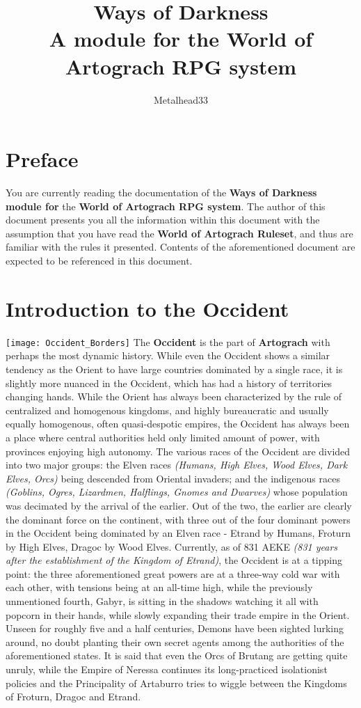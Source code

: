 \documentclass[openany,11pt,a4paper]{book}
\author{Metalhead33}
\title{Ways of Darkness\\
   \normalsize A module for the World of Artograch RPG system}
\begin{document}
\maketitle
\tableofcontents
\chapter*{Preface}
You are currently reading the documentation of the \textbf{Ways of Darkness module for} the \textbf{World of Artograch RPG system}. The author of this document presents you all the information within this document with the assumption that you have read the \textbf{World of Artograch Ruleset}, and thus are familiar with the rules it presented. Contents of the aforementioned document are expected to be referenced in this document.
\chapter{Introduction to the Occident}
\texttt{[image: Occident\_Borders]}
\newpage
The \textbf{Occident} is the part of \textbf{Artograch} with perhaps the most dynamic history. While even the Occident shows a similar tendency as the Orient to have large countries dominated by a single race, it is slightly more nuanced in the Occident, which has had a history of territories changing hands. While the Orient has always been characterized by the rule of centralized and homogenous kingdoms, and highly bureaucratic and usually equally homogenous, often quasi-despotic empires, the Occident has always been a place where central authorities held only limited amount of power, with provinces enjoying high autonomy.\newline
The various races of the Occident are divided into two major groups: the Elven races \textit{(Humans, High Elves, Wood Elves, Dark Elves, Orcs)} being descended from Oriental invaders; and the indigenous races \textit{(Goblins, Ogres, Lizardmen, Halflings, Gnomes and Dwarves)} whose population was decimated by the arrival of the earlier. Out of the two, the earlier are clearly the dominant force on the continent, with three out of the four dominant powers in the Occident being dominated by an Elven race - Etrand by Humans, Froturn by High Elves, Dragoc by Wood Elves.\newline
Currently, as of 831 AEKE \textit{(831 years after the establishment of the Kingdom of Etrand)}, the Occident is at a tipping point: the three aforementioned great powers are at a three-way cold war with each other, with tensions being at an all-time high, while the previously unmentioned fourth, Gabyr, is sitting in the shadows watching it all with popcorn in their hands, while slowly expanding their trade empire in the Orient. Unseen for roughly five and a half centuries, Demons have been sighted lurking around, no doubt planting their own secret agents among the authorities of the aforementioned states. It is said that even the Orcs of Brutang are getting quite unruly, while the Empire of Neressa continues its long-practiced isolationist policies and the Principality of Artaburro tries to wiggle between the Kingdoms of Froturn, Dragoc and Etrand.
\end{document}
